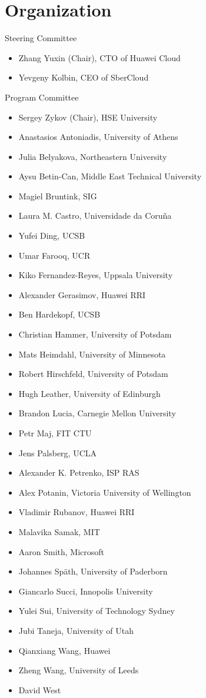 \newpage
\section*{Organization}

\begin{multicols}{2}
\raggedright
Steering Committee

\begin{itemize}
\item Zhang Yuxin (Chair), CTO of Huawei Cloud
\item Yevgeny Kolbin, CEO of SberCloud
\end{itemize}

Program Committee

\begin{itemize}
\item Sergey Zykov (Chair), HSE University
\item Anastasios Antoniadis, University of Athens
\item Julia Belyakova, Northeastern University
\item Aysu Betin-Can, Middle East Technical University
\item Magiel Bruntink, SIG
\item Laura M. Castro, Universidade da Coruña
\item Yufei Ding, UCSB
\item Umar Farooq, UCR
\item Kiko Fernandez-Reyes, Uppsala University
\item Alexander Gerasimov, Huawei RRI
\item Ben Hardekopf, UCSB
\item Christian Hammer, University of Potsdam
\item Mats Heimdahl, University of Minnesota
\item Robert Hirschfeld, University of Potsdam
\item Hugh Leather, University of Edinburgh
\item Brandon Lucia, Carnegie Mellon University
\item Petr Maj, FIT CTU
\item Jens Palsberg, UCLA
\item Alexander K. Petrenko, ISP RAS
\item Alex Potanin, Victoria University of Wellington
\item Vladimir Rubanov, Huawei RRI
\item Malavika Samak, MIT
\item Aaron Smith, Microsoft
\item Johannes Späth, University of Paderborn
\item Giancarlo Succi, Innopolis University
\item Yulei Sui, University of Technology Sydney
\item Jubi Taneja, University of Utah
\item Qianxiang Wang, Huawei
\item Zheng Wang, University of Leeds
\item David West
\end{itemize}


\end{multicols}

